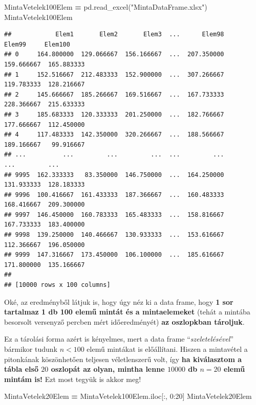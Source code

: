 \documentclass[
]{book}
\newenvironment{Shaded}{\begin{snugshade}}{\end{snugshade}}
\newcommand{\DecValTok}[1]{\textcolor[rgb]{0.00,0.00,0.81}{#1}}
\newcommand{\NormalTok}[1]{#1}
\newcommand{\OperatorTok}[1]{\textcolor[rgb]{0.81,0.36,0.00}{\textbf{#1}}}
\newcommand{\StringTok}[1]{\textcolor[rgb]{0.31,0.60,0.02}{#1}}
\begin{document}
\begin{Shaded}
\begin{Highlighting}[]
\NormalTok{MintaVetelek100Elem }\OperatorTok{=}\NormalTok{ pd.read\_excel(}\StringTok{"MintaDataFrame.xlsx"}\NormalTok{)}
\NormalTok{MintaVetelek100Elem}
\end{Highlighting}
\end{Shaded}

\begin{verbatim}
##            Elem1       Elem2       Elem3  ...      Elem98      Elem99     Elem100
## 0     164.800000  129.066667  156.166667  ...  207.350000  159.666667  165.883333
## 1     152.516667  212.483333  152.900000  ...  307.266667  119.783333  128.216667
## 2     145.666667  185.266667  169.516667  ...  167.733333  228.366667  215.633333
## 3     185.683333  120.333333  201.250000  ...  182.766667  177.666667  112.450000
## 4     117.483333  142.350000  320.266667  ...  188.566667  189.166667   99.916667
## ...          ...         ...         ...  ...         ...         ...         ...
## 9995  162.333333   83.350000  146.750000  ...  164.250000  131.933333  128.183333
## 9996  100.416667  161.433333  187.366667  ...  160.483333  168.416667  209.300000
## 9997  146.450000  160.783333  165.483333  ...  158.816667  167.733333  183.400000
## 9998  139.250000  140.466667  130.933333  ...  153.616667  112.366667  196.050000
## 9999  147.316667  173.450000  106.100000  ...  185.616667  171.800000  135.166667
## 
## [10000 rows x 100 columns]
\end{verbatim}

Oké, az eredményből látjuk is, hogy úgy néz ki a data frame, hogy \textbf{1 sor tartalmaz 1 db 100 elemű mintát és a mintaelemeket} (tehát a mintába besorsolt versenyző percben mért időeredményét) \textbf{az oszlopkban tároljuk}.

Ez a tárolási forma azért is kényelmes, mert a data frame ``\emph{szeletelésével}'' bármikor tudunk \(n<100\) elemű mintákat is előállítani. Hiszen a mintavétel a pitonkának köszönhetően teljesen véletlenszerű volt, így \textbf{ha kiválasztom a tábla első \(20\) oszlopát az olyan, mintha lenne \(10000\) db \(n=20\) elemű mintám is!}
Ezt most tegyük is akkor meg!

\begin{Shaded}
\begin{Highlighting}[]
\NormalTok{MintaVetelek20Elem }\OperatorTok{=}\NormalTok{ MintaVetelek100Elem.iloc[:, }\DecValTok{0}\NormalTok{:}\DecValTok{20}\NormalTok{]}
\NormalTok{MintaVetelek20Elem}
\end{Highlighting}
\end{Shaded}
\end{document}
